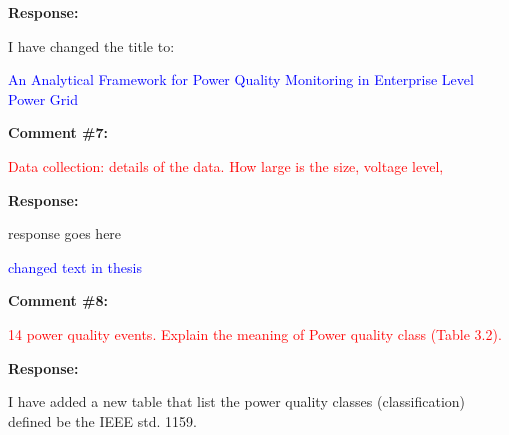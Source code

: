 \documentclass[journal]{IEEEtran}
\begin{document}
\vspace{5pt}
\textbf{Response:}
\begin{adjustwidth}{2.5em}{0pt}
I have changed the title to:

\vspace{5pt}
\noindent\textcolor{blue}{An Analytical Framework for Power Quality Monitoring in Enterprise Level Power Grid}
\end{adjustwidth}


\vspace{30pt}
\textbf{Comment \#7:}
\begin{adjustwidth}{2.5em}{0pt}
\singlespacing \vspace{-10pt}
\textcolor{red}{Data collection: details of the data. How large is the size, voltage level,}
\end{adjustwidth}

\vspace{10pt}
\textbf{Response:}
\begin{adjustwidth}{2.5em}{0pt}
response goes here

\vspace{10pt}
\noindent\textcolor{blue}{changed text in thesis}
\end{adjustwidth}


\vspace{30pt}
\textbf{Comment \#8:}
\begin{adjustwidth}{2.5em}{0pt}
\singlespacing \vspace{-10pt}
\textcolor{red}{14 power quality events. Explain the meaning of Power quality class (Table 3.2).}
\end{adjustwidth}

\vspace{10pt}
\textbf{Response:}
\begin{adjustwidth}{2.5em}{0pt}
I have added a new table that list the power quality classes (classification) defined be the IEEE std. 1159.
\end{adjustwidth}
\end{document}
